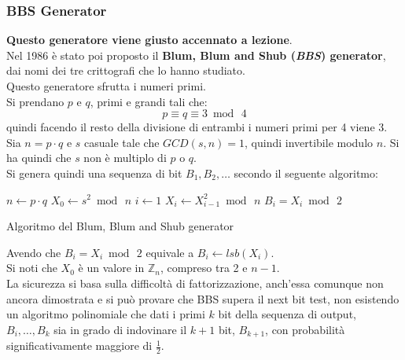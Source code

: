 \documentclass[a4paper,12pt, oneside]{book}
\begin{document}
\subsubsection{BBS Generator}
\textbf{Questo generatore viene giusto accennato a lezione}.\\
Nel 1986 è stato poi proposto il \textbf{Blum, Blum and Shub (\textit{BBS})
  generator}, dai nomi dei tre crittografi che lo hanno studiato. \\
Questo generatore sfrutta i numeri primi.\\
Si prendano $p$ e $q$, primi e grandi tali che:
\[p\equiv q\equiv 3\bmod\, 4\]
quindi facendo il resto della divisione di entrambi i numeri primi per 4 viene
3.\\ 
Sia $n=p\cdot q$ e $s$ casuale tale che $GCD(s,n)=1$, quindi invertibile modulo
$n$. Si ha quindi che $s$ non è multiplo di $p$ o $q$.\\
Si genera quindi una sequenza di bit $B_1,B_2,\ldots$ secondo il seguente
algoritmo:
\begin{algorithm}
  \begin{algorithmic}
    \State $n\gets p\cdot q$
    \State $X_0\gets s^2\bmod\,n$
    \State $i\gets 1$
    \While {$\top$}
    \State $X_i\gets X_{i-1}^2\bmod \,n$
    \State $B_i=X_i\bmod\,2$
    \EndWhile
    \EndFunction
  \end{algorithmic}
  \caption{Algoritmo del Blum, Blum and Shub generator}
\end{algorithm}
Avendo che $B_i=X_i\bmod\,2$ equivale a $B_i\gets lsb(X_i)$.\\
Si noti che $X_0$ è un valore in $\mathbb{Z}_n$, compreso tra 2 e $n-1$.\\
La sicurezza si basa sulla difficoltà di fattorizzazione, anch'essa comunque non
ancora dimostrata e si può provare che BBS supera il next bit test, non
esistendo un algoritmo polinomiale che dati i primi $k$ bit della sequenza di
output, $B_i,\ldots,B_k$ sia in grado di indovinare il $k+1$ bit, $B_{k+1}$, con
probabilità significativamente maggiore di $\frac{1}{2}$.
\end{document}
